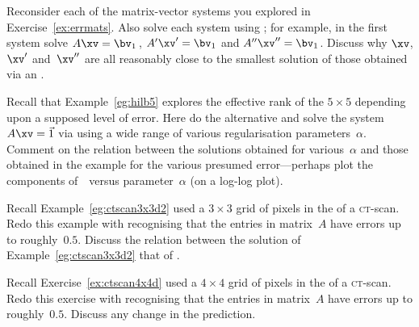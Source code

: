 \begin{exercise} \label{ex:} 
Reconsider each of the matrix-vector systems you explored in Exercise~\ref{ex:errmats}.
Also solve each system using ; for example, in the first system solve \(A\xv=\bv_1\)\,, \(A'\xv'=\bv_1\) and \(A''\xv''=\bv_1\).
Discuss why \(\xv\), \(\xv'\) and~\(\xv''\) are all reasonably close to the smallest solution of those obtained via an \svd.
\end{exercise}




\begin{exercise} \label{ex:} 
Recall that Example~\ref{eg:hilb5} explores the effective rank of the \(5\times5\)  depending upon a supposed level of error.
Here do the alternative and solve the system \(A\xv=\vec 1\) via  using a wide range of various regularisation parameters~\(\alpha\).
Comment on the relation between the solutions obtained for various~\(\alpha\) and those obtained in the example for the various presumed error---perhaps plot the components of~\xv\ versus parameter~\(\alpha\) (on a log-log plot).
\end{exercise}




\begin{exercise} \label{ex:} 
Recall Example~\ref{eg:ctscan3x3d2} used a \(3\times3\) grid of pixels in the  of a \textsc{ct}-scan.
Redo this example with  recognising that the entries in matrix~\(A\) have errors up to roughly~\(0.5\).
Discuss the relation between the solution of Example~\ref{eg:ctscan3x3d2} that of .
\end{exercise}




\begin{exercise} \label{ex:} 
Recall Exercise~\ref{ex:ctscan4x4d} used a \(4\times4\) grid of pixels in the  of a \textsc{ct}-scan.
Redo this exercise with  recognising that the entries in matrix~\(A\) have errors up to roughly~\(0.5\).
Discuss any change in the prediction.
\end{exercise}








\begin{comment}%
why, what caused X?
how did X occur?
what-if? what-if-not?
how does X compare with Y?
what is the evidence for X?
why is X important?
\end{comment}






